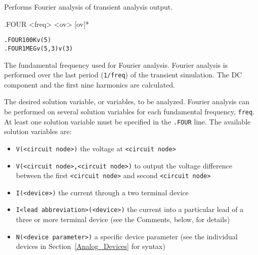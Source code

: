 



Performs Fourier analysis of transient analysis output.

\begin{Command}

\format
.FOUR <freq> <ov> [ov]*

\examples
\begin{alltt}
.FOUR 100K v(5)
.FOUR 1MEG v(5,3) v(3)
\end{alltt}

\arguments

\begin {Arguments}

The fundamental frequency used for Fourier analysis.
Fourier analysis is performed over the last period (\texttt{1/freq}) of the transient simulation.
The DC component and the first nine harmonics are calculated.  

The desired solution variable, or variables, to be analyzed. Fourier analysis can be performed
on several solution variables for each fundamental frequency, \texttt{freq}. At least one
solution variable must be specified in the {\tt .FOUR} line.
The available solution variables are:

\begin{itemize}
\item \texttt{V(<circuit node>)} the voltage at \texttt{<circuit node>}
\item \texttt{V(<circuit node>,<circuit node>)} to output the voltage difference between the first \texttt{<circuit node>} and second \texttt{<circuit node>}  
\item \texttt{I(<device>)} the current through a two terminal device
\item \texttt{I<lead abbreviation>(<device>)} the current into a particular lead of a three or more terminal device (see the Comments, below, for details)
\item \texttt{N(<device parameter>)} a specific device parameter (see the individual devices in Section~\ref{Analog_Devices} for syntax)
\end{itemize}


\end{Arguments}
\end{Command}

